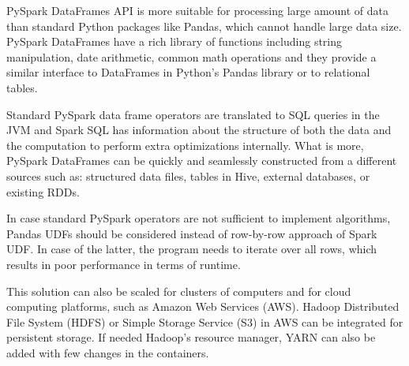 PySpark DataFrames API is more suitable for processing large amount of data than standard Python packages like Pandas, which cannot handle large data size. PySpark DataFrames have a rich library of functions including string manipulation, date arithmetic, common math operations and they provide a similar interface to DataFrames in Python's Pandas library or to relational tables. \cite{spark-sql}

Standard PySpark data frame operators are translated to SQL queries in the JVM and Spark SQL has information about the structure of both the data and the computation to perform extra optimizations internally. What is more, PySpark DataFrames can be quickly and seamlessly constructed from a different sources such as: structured data files, tables in Hive, external databases, or existing RDDs. \cite{spark-sql} 

In case standard PySpark operators are not sufficient to implement algorithms, Pandas UDFs should be considered instead of row-by-row approach of Spark UDF. In case of the latter, the program needs to iterate over all rows, which results in poor performance in terms of runtime.

This solution can also be scaled for clusters of computers and for cloud computing platforms, such as Amazon Web Services (AWS). Hadoop Distributed File System (HDFS) or Simple Storage Service (S3) in AWS can be integrated for persistent storage. If needed Hadoop's resource manager, YARN can also be added with few changes in the containers.
